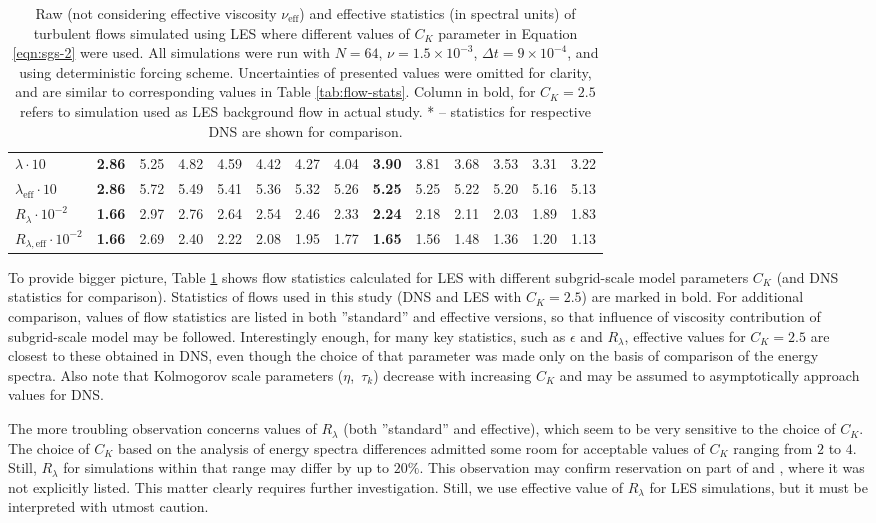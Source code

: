 \documentclass{pracamgren}
\begin{document}
\begin{table}[h]
\begin{tabular}{llllllllllllll}
$\lambda \cdot 10$ & \textbf{2.86} & 5.25 & 4.82 & 4.59 & 4.42 & 4.27 & 4.04 & \textbf{3.90} & 3.81 & 3.68 & 3.53 & 3.31 & 3.22 \\
$\lambda_{\text{eff}} \cdot 10$ & \textbf{2.86} & 5.72 & 5.49 & 5.41 & 5.36 & 5.32 & 5.26 & \textbf{5.25} & 5.25 & 5.22 & 5.20 & 5.16 & 5.13 \\
$R_{\lambda} \cdot 10^{-2}$ & \textbf{1.66} & 2.97 & 2.76 & 2.64 & 2.54 & 2.46 & 2.33 & \textbf{2.24} & 2.18 & 2.11 & 2.03 & 1.89 & 1.83 \\
$R_{\lambda, \text{eff}} \cdot 10^{-2}$ & \textbf{1.66} & 2.69 & 2.40 & 2.22 & 2.08 & 1.95 & 1.77 & \textbf{1.65} & 1.56 & 1.48 & 1.36 & 1.20 & 1.13 \\ \hline
\end{tabular}
\caption{Raw (not considering effective viscosity $\nu_{\text{eff}}$) and effective statistics (in spectral units) of turbulent flows simulated using LES where different values of $C_K$ parameter in Equation \ref{eqn:sgs-2} were used. All simulations were run with $N=64$, $\nu = 1.5 \times 10^{-3}$, $\Delta t = 9 \times 10^{-4}$, and using deterministic forcing scheme. Uncertainties of presented values were omitted for clarity, and are similar to corresponding values in Table \ref{tab:flow-stats}. Column in bold, for $C_K=2.5$ refers to simulation used as LES background flow in actual study. * -- statistics for respective DNS are shown for comparison.
}
\label{tab:sgs-stats}
\end{table}

To provide bigger picture, Table \ref{tab:sgs-stats} shows flow statistics calculated for LES with different subgrid-scale model parameters $C_K$ (and DNS statistics for comparison).
Statistics of flows used in this study (DNS and LES with $C_K=2.5$) are marked in bold.
For additional comparison, values of flow statistics are listed in both ''standard'' and effective versions, so that influence of viscosity contribution of subgrid-scale model may be followed.
Interestingly enough, for many key statistics, such as $\epsilon$ and $R_{\lambda}$, effective values for $C_K=2.5$ are closest to these obtained in DNS, even though the choice of that parameter was made only on the basis of comparison of the energy spectra.
Also note that Kolmogorov scale parameters ($\eta$,~$\tau_k$) decrease with increasing $C_K$ and may be assumed to asymptotically approach values for DNS.

The more troubling observation concerns values of $R_{\lambda}$ (both ''standard'' and effective), which seem to be very sensitive to the choice of $C_K$.
The choice of $C_K$ based on the analysis of energy spectra differences admitted some room for acceptable values of $C_K$ ranging from $2$ to $4$.
Still, $R_{\lambda}$ for simulations within that range may differ by up to $20\%$.
This observation may confirm reservation on part of \textcite{Yang2008} and \textcite{Jin2010}, where it was not explicitly listed.
This matter clearly requires further investigation.
Still, we use effective value of $R_{\lambda}$ for LES simulations, but it must be interpreted with utmost caution.  
\end{document}
